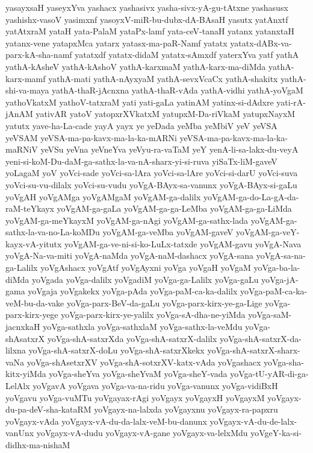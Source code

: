 {yasayxsaH
yaseyxYva
yashacx
yashasivx
yasha-sivx-yA-gu-tAtxne
yashasusx
yashishx-vasoV
yasimxnf
yasoyxV-miR-bu-dubx-dA-BAsaH
yasutx
yatAnxtf
yatAtxraM
yataH
yata-PalaM
yataPx-lamf
yata-ceV-tanaH
yatanx
yatanxtaH
yatanx-vene
yatapxMca
yatarx
yatasx-ma-paR-Namf
yatatx
yatatx-dABx-va-parx-kA-sha-namf
yatatxdf
yatatx-didaM
yatatx-sAmxdf
yaterxYva
yatf
yathA
yathA-kAsheV
yathA-kAshoV
yathA-karxmaM
yathA-karx-ma-diMda
yathA-karx-mamf
yathA-mati
yathA-nAyxyaM
yathA-sevxVcaCx
yathA-shakitx
yathA-shi-va-maya
yathA-thaR-jAcnxna
yathA-thaR-vAda
yathA-vidhi
yathA-yoVgaM
yathoVkatxM
yathoV-tatxraM
yati
yati-gaLa
yatinAM
yatinx-si-dAdxre
yati-rA-jAnAM
yativAR
yatoV
yatopxrXVkatxM
yatupxM-Da-riVkaM
yatupxNayxM
yatutx
yave-ha-La-cade
yayA
yayx
ye
yeDada
yeMba
yeMbiV
yeV
yeVSA
yeVSAM
yeVSA-ma-pa-kavx-ma-la-ka-mARNi
yeVSA-ma-pa-kavx-ma-la-ka-maRNiV
yeVSu
yeVna
yeVneYva
yeVyu-ra-vaTaM
yeY
yenA-li-sa-lakx-du-veyA
yeni-si-koM-Du-daM-ga-sathx-la-va-nA-sharx-yi-si-ruva
yiSaTx-liM-gaveV
yoLagaM
yoV
yoVci-sade
yoVci-sa-lAra
yoVci-sa-lAre
yoVci-si-darU
yoVci-suva
yoVci-su-vu-dilalx
yoVci-su-vudu
yoVgA-BAyx-sa-vanunx
yoVgA-BAyx-si-gaLu
yoVgAH
yoVgAMga
yoVgAMgaM
yoVgAM-ga-dalilx
yoVgAM-ga-do-La-gA-da-raM-teYkayx
yoVgAM-ga-gaLa
yoVgAM-ga-ga-LeMba
yoVgAM-ga-ga-LiMda
yoVgAM-ga-meYkayxM
yoVgAM-ga-nAgi
yoVgAM-ga-sathx-lada
yoVgAM-ga-sathx-la-va-no-La-koMDu
yoVgAM-ga-veMba
yoVgAM-gaveV
yoVgAM-ga-veY-kayx-vA-yitutx
yoVgAM-ga-ve-ni-si-ko-LuLx-tatxde
yoVgAM-gavu
yoVgA-Nava
yoVgA-Na-va-miti
yoVgA-naMda
yoVgA-naM-dashacx
yoVgA-sana
yoVgA-sa-na-ga-Lalilx
yoVgAshacx
yoVgAtf
yoVgAyxni
yoVga
yoVgaH
yoVgaM
yoVga-ba-la-diMda
yoVgada
yoVga-dalilx
yoVgadiM
yoVga-ga-Lalilx
yoVga-gaLu
yoVga-jA-gama
yoVgaja
yoVgakekx
yoVga-pAda
yoVga-paM-ca-ka-dalilx
yoVga-paM-ca-ka-veM-bu-da-vake
yoVga-parx-BeV-da-gaLu
yoVga-parx-kirx-ye-ga-Lige
yoVga-parx-kirx-yege
yoVga-parx-kirx-ye-yalilx
yoVga-sA-dha-ne-yiMda
yoVga-saM-jacnxkaH
yoVga-sathxla
yoVga-sathxlaM
yoVga-sathx-la-veMdu
yoVga-shAsatxrX
yoVga-shA-satxrXda
yoVga-shA-satxrX-dalilx
yoVga-shA-satxrX-da-lilxna
yoVga-shA-satxrX-doLu
yoVga-shA-satxrXkekx
yoVga-shA-satxrX-sharx-vaNa
yoVga-shAsetxrXV
yoVga-shA-sotxrXV-katx-vAda
yoVgashacx
yoVga-sha-kitx-yiMda
yoVga-sheYva
yoVga-sheYvaM
yoVga-sheY-vada
yoVga-tU-yAR-di-ga-LelAlx
yoVgavA
yoVgava
yoVga-va-na-ridu
yoVga-vanunx
yoVga-vidiBxH
yoVgavu
yoVga-vuMTu
yoVgayax-rAgi
yoVgayx
yoVgayxH
yoVgayxM
yoVgayx-du-pa-deV-sha-kataRM
yoVgayx-na-lalxda
yoVgayxnu
yoVgayx-ra-papxru
yoVgayx-vAda
yoVgayx-vA-du-da-lalx-veM-bu-danunx
yoVgayx-vA-du-de-lalx-vanUnx
yoVgayx-vA-dudu
yoVgayx-vA-gane
yoVgayx-va-lelxMdu
yoVgeY-ka-si-didhx-ma-nishaM
}

